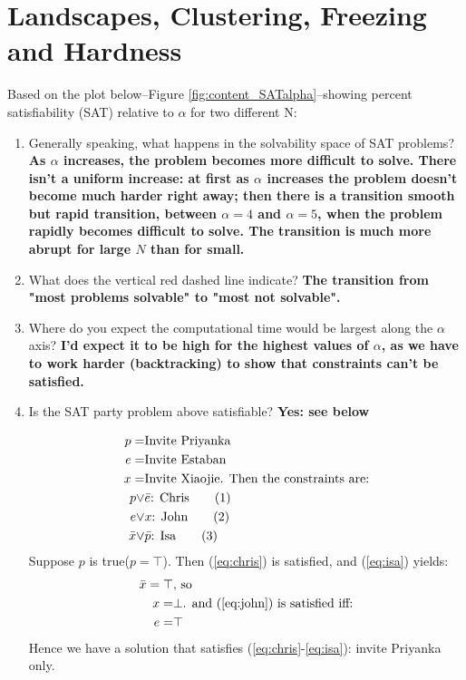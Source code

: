 \documentclass[]{article}
\newcommand\numberthis{\addtocounter{equation}{1}\tag{\theequation}}
\begin{document}
\section{Landscapes, Clustering, Freezing and Hardness}

Based on the plot below--Figure \ref{fig:content_SATalpha}--showing percent satisfiability (SAT) relative to $\alpha$ for two different N:

\begin{enumerate}
	\item  Generally speaking, what happens in the solvability space of SAT problems? \textbf{As  $\alpha$ increases, the problem becomes more difficult to solve. There isn't a uniform increase: at first as  $\alpha$ increases the problem doesn't become much harder right away; then there is a transition smooth but rapid transition, between  $\alpha=4$ and  $\alpha=5$, when the problem rapidly becomes difficult to solve.  The transition is much more abrupt for large $N$ than for small.}

	\item  What does the vertical red dashed line indicate? \textbf{The transition from "most problems solvable" to "most not solvable".}

	\item   Where do you expect the computational time would be largest along the $\alpha$ axis? \textbf{I'd expect it to be high for the highest values of $\alpha$, as we have to work harder (backtracking) to show that constraints can't be satisfied.}

	\item   Is the SAT party problem above satisfiable? \textbf{Yes: see below}
	
	\begin{align*}
		p =& \text{Invite Priyanka}\\
		e =& \text {Invite Estaban}\\
		x =& \text{Invite Xiaojie. Then the constraints are:}\\
		p \lor& \bar{e} \text{: Chris} \numberthis \label{eq:chris}\\
		e \lor& x \text{: John} \numberthis \label{eq:john}\\
		\bar{x} \lor& \bar{p} \text{: Isa} \numberthis \label{eq:isa}
	\end{align*}
	Suppose $p$ is true($p=\top$). Then (\ref{eq:chris}) is satisfied, and (\ref{eq:isa}) yields:
	\begin{align*}
		\bar{x}=\top& \text{, so}\\
		x =& \bot \text{. and (\ref{eq:john}) is satisfied iff:}\\
		e =& \top 
	\end{align*}
	Hence we have a solution that satisfies (\ref{eq:chris}-\ref{eq:isa}): invite Priyanka only.
\end{enumerate}
\end{document}

